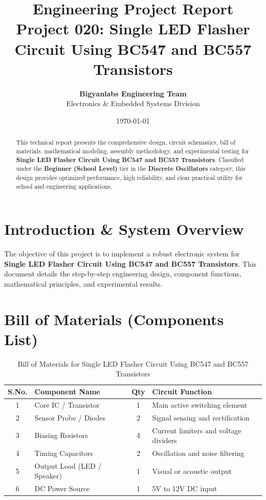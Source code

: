 \documentclass[11pt,a4paper]{article}
\title{\textbf{\Huge Engineering Project Report}\\[0.5em] \Large Project 020: Single LED Flasher Circuit Using BC547 and BC557 Transistors}
\author{\textbf{Bigyanlabs Engineering Team}\\ Electronics \& Embedded Systems Division}
\date{\today}
\begin{document}
\maketitle
\thispagestyle{empty}

\begin{abstract}
This technical report presents the comprehensive design, circuit schematics, bill of materials, mathematical modeling, assembly methodology, and experimental testing for \textbf{Single LED Flasher Circuit Using BC547 and BC557 Transistors}. Classified under the \textbf{Beginner (School Level)} tier in the \textbf{Discrete Oscillators} category, this design provides optimized performance, high reliability, and clear practical utility for school and engineering applications.
\end{abstract}

\newpage
\tableofcontents
\newpage

\section{Introduction \& System Overview}
The objective of this project is to implement a robust electronic system for \textbf{Single LED Flasher Circuit Using BC547 and BC557 Transistors}. This document details the step-by-step engineering design, component functions, mathematical principles, and experimental results.

\section{Bill of Materials (Components List)}
\begin{table}[h!]
\centering
\caption{Bill of Materials for Single LED Flasher Circuit Using BC547 and BC557 Transistors}
\vspace{0.5em}
\begin{tabular}{clcp{7cm}}
\toprule
\textbf{S.No.} & \textbf{Component Name} & \textbf{Qty} & \textbf{Circuit Function} \\
\midrule
1 & Core IC / Transistor & 1 & Main active switching element \\
2 & Sensor Probe / Diodes & 2 & Signal sensing and rectification \\
3 & Biasing Resistors & 4 & Current limiters and voltage dividers \\
4 & Timing Capacitors & 2 & Oscillation and noise filtering \\
5 & Output Load (LED / Speaker) & 1 & Visual or acoustic output \\
6 & DC Power Source & 1 & 5V to 12V DC input \\
\bottomrule
\end{tabular}
\end{table}
\end{document}
